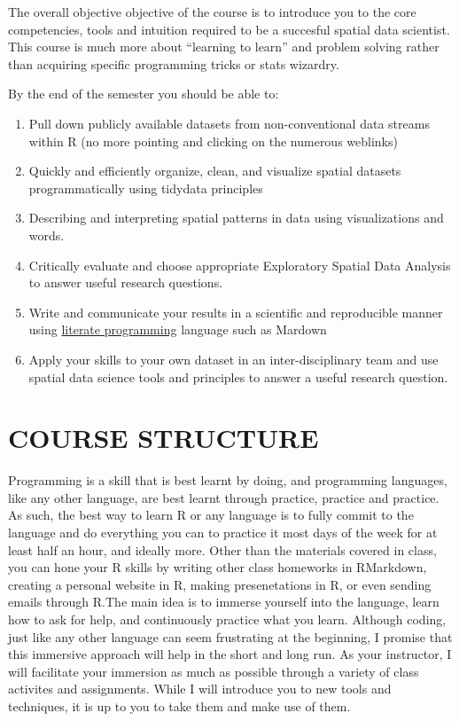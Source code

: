 \documentclass[11pt,]{article}
\begin{document}
The overall objective objective of the course is to introduce you to the
core competencies, tools and intuition required to be a succesful
spatial data scientist. This course is much more about ``learning to
learn'' and problem solving rather than acquiring specific programming
tricks or stats wizardry.

By the end of the semester you should be able to:

\begin{enumerate}
\def\labelenumi{\arabic{enumi}.}
\item
  Pull down publicly available datasets from non-conventional data
  streams within R (no more pointing and clicking on the numerous
  weblinks)
\item
  Quickly and efficiently organize, clean, and visualize spatial
  datasets programmatically using tidydata principles
\item
  Describing and interpreting spatial patterns in data using
  visualizations and words.
\item
  Critically evaluate and choose appropriate Exploratory Spatial Data
  Analysis to answer useful research questions.
\item
  Write and communicate your results in a scientific and reproducible
  manner using
  \href{http://ross.net/funnelweb/tutorial/intro_what.html}{literate
  programming} language such as Mardown
\item
  Apply your skills to your own dataset in an inter-disciplinary team
  and use spatial data science tools and principles to answer a useful
  research question.
\end{enumerate}

\hypertarget{course-structure}{%
\section{COURSE STRUCTURE}\label{course-structure}}

Programming is a skill that is best learnt by doing, and programming
languages, like any other language, are best learnt through practice,
practice and practice. As such, the best way to learn R or any language
is to fully commit to the language and do everything you can to practice
it most days of the week for at least half an hour, and ideally more.
Other than the materials covered in class, you can hone your R skills by
writing other class homeworks in RMarkdown, creating a personal website
in R, making presenetations in R, or even sending emails through R.The
main idea is to immerse yourself into the language, learn how to ask for
help, and continuously practice what you learn. Although coding, just
like any other language can seem frustrating at the beginning, I promise
that this immersive approach will help in the short and long run. As
your instructor, I will facilitate your immersion as much as possible
through a variety of class activites and assignments. While I will
introduce you to new tools and techniques, it is up to you to take them
and make use of them.
\end{document}
